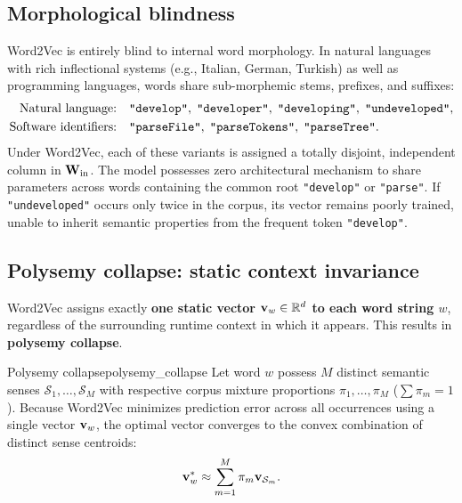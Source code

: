 \documentclass[../../main.tex]{subfiles}
\begin{document}
\subsection{Morphological blindness}
\label{subsec:morphological_blindness}

Word2Vec is entirely blind to internal word morphology. In natural languages with rich inflectional systems (e.g., Italian, German, Turkish) as well as programming languages, words share sub-morphemic stems, prefixes, and suffixes:
\begin{align*}
\text{Natural language:} \quad &\text{\texttt{"develop"}}, \; \text{\texttt{"developer"}}, \; \text{\texttt{"developing"}}, \; \text{\texttt{"undeveloped"}}, \\
\text{Software identifiers:} \quad &\text{\texttt{"parseFile"}}, \; \text{\texttt{"parseTokens"}}, \; \text{\texttt{"parseTree"}}.
\end{align*}
Under Word2Vec, each of these variants is assigned a totally disjoint, independent column in $\mathbf{W}_{\text{in}}$. The model possesses zero architectural mechanism to share parameters across words containing the common root \texttt{"develop"} or \texttt{"parse"}. If \texttt{"undeveloped"} occurs only twice in the corpus, its vector remains poorly trained, unable to inherit semantic properties from the frequent token \texttt{"develop"}.

\subsection{Polysemy collapse: static context invariance}
\label{subsec:polysemy_collapse}

Word2Vec assigns exactly \textbf{one static vector $\mathbf{v}_w \in \mathbb{R}^d$ to each word string $w$}, regardless of the surrounding runtime context in which it appears. This results in \textbf{polysemy collapse}.

\begin{definition}{Polysemy collapse}{polysemy_collapse}
Let word $w$ possess $M$ distinct semantic senses $\mathcal{S}_1, \dots, \mathcal{S}_M$ with respective corpus mixture proportions $\pi_1, \dots, \pi_M$ ($\sum \pi_m = 1$). Because Word2Vec minimizes prediction error across all occurrences using a single vector $\mathbf{v}_w$, the optimal vector converges to the convex combination of distinct sense centroids:
\begin{equation}
\label{eq:polysemy_convex_combination}
\mathbf{v}_w^* \approx \sum_{m=1}^M \pi_m \mathbf{v}_{\mathcal{S}_m}.
\end{equation}
\end{definition}
\end{document}
